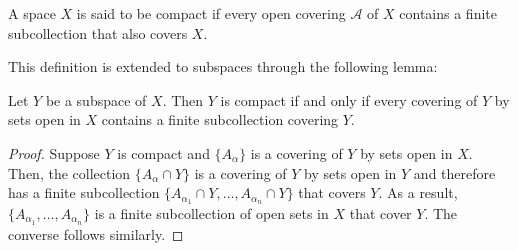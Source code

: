 \begin{definition}[Compact]
    A space $X$ is said to be compact if every open covering $\mathscr{A}$ of $X$ contains a finite subcollection that also covers $X$.
\end{definition}

This definition is extended to subspaces through the following lemma:
\begin{lemma}
    Let $Y$ be a subspace of $X$. Then $Y$ is compact if and only if every covering of $Y$ by sets open in $X$ contains a finite subcollection covering $Y$.
\end{lemma}
\begin{proof}
    Suppose $Y$ is compact and $\{A_\alpha\}$ is a covering of $Y$ by sets open in $X$. Then, the collection $\{A_\alpha\cap Y\}$ is a covering of $Y$ by sets open in $Y$ and therefore has a finite subcollection $\{A_{\alpha_1}\cap Y,\ldots, A_{\alpha_n}\cap Y\}$ that covers $Y$. As a result, $\{A_{\alpha_1},\ldots,A_{\alpha_n}\}$ is a finite subcollection of open sets in $X$ that cover $Y$. The converse follows similarly.
\end{proof}

